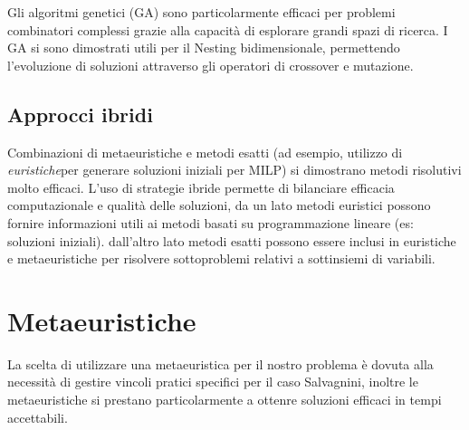 Gli algoritmi genetici (GA) sono particolarmente efficaci per problemi combinatori complessi grazie alla capacità di esplorare grandi spazi di ricerca. I GA si sono dimostrati utili per il Nesting bidimensionale, permettendo l'evoluzione di soluzioni attraverso gli operatori di crossover e mutazione.


\subsection{Approcci ibridi}

Combinazioni di metaeuristiche e metodi esatti (ad esempio, utilizzo di \emph{euristiche}\glsfirstoccur per generare soluzioni iniziali per MILP) si dimostrano metodi risolutivi molto efficaci. L'uso di strategie ibride permette di bilanciare efficacia computazionale e qualità delle soluzioni, da un lato metodi euristici possono fornire informazioni utili ai metodi basati su programmazione lineare (es: soluzioni iniziali). dall'altro lato metodi esatti possono essere inclusi in euristiche e metaeuristiche per risolvere sottoproblemi relativi a sottinsiemi di variabili. 

\section{Metaeuristiche}

La scelta di utilizzare una metaeuristica per il nostro problema è dovuta alla necessità di gestire vincoli pratici specifici per il caso Salvagnini, inoltre le metaeuristiche si prestano particolarmente a ottenre soluzioni efficaci in tempi accettabili.

